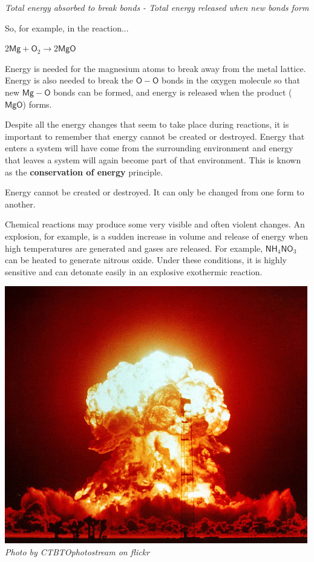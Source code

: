       \label{m38711*id64364}
        \textsl{Total energy absorbed to break bonds - Total energy released when new bonds form}
      \par 
      \label{m38711*id64371}So, for example, in the reaction...\par 
      \label{m38711*id64375}$2\mathsf{Mg}+{\mathsf{O}}_{2}\to  2\mathsf{MgO}$
      \par 
      \label{m38711*id64411}Energy is needed for the magnesium atoms to break away from the metal lattice. Energy is also needed to break the $\mathsf{O}-\mathsf{O}$ bonds in the oxygen molecule so that new $\mathsf{Mg}-\mathsf{O}$ bonds can be formed, and energy is released when the product ($\mathsf{MgO}$) forms.\par 
      \label{m38711*id64416}Despite all the energy changes that seem to take place during reactions, it is important to remember that energy cannot be created or destroyed. Energy that enters a system will have come from the surrounding environment and energy that leaves a system will again become part of that environment. This is known as the \textbf{conservation of energy} principle.\par 
\label{m38711*fhsst!!!underscore!!!id409}
 { \label{m38711*meaningfhsst!!!underscore!!!id409}
      Energy cannot be created or destroyed. It can only be changed from one form to another. 
       } 
\begin{minipage}{.5\textwidth}
      \label{m38711*id64445}Chemical reactions may produce some very visible and often violent changes. An explosion, for example, is a sudden increase in volume and release of energy when high temperatures are generated and gases are released. For example, $\mathsf{NH}_{4}{\mathsf{NO}}_{3}$ can be heated to generate nitrous oxide. Under these conditions, it is highly sensitive and can detonate easily in an explosive exothermic reaction.\par
\end{minipage}
\begin{minipage}{.5\textwidth}
\begin{center}
 \includegraphics[width=.3\textwidth]{photos/explosionby_CTBTOphotostream_flickr.jpg} \\
\textsl{Photo by CTBTOphotostream on flickr}
\end{center}
\end{minipage}
 
